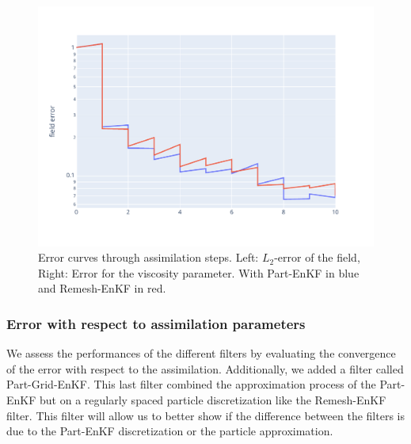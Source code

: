 \begin{figure}[htbp]
	\centering
	\includegraphics*[width=\linewidth]{images/app2d/field_error_w_assim.pdf}
	\caption{Error curves through assimilation steps. Left: \(L_2\)-error of the field, Right: Error for the viscosity parameter. With Part-EnKF in blue and Remesh-EnKF in red.}
	\label{fig:assim_time}
\end{figure}


\subsubsection{Error with respect to assimilation parameters}
We assess the performances of the different filters by evaluating the convergence of the error with respect to the assimilation. Additionally, we added a filter called Part-Grid-EnKF. This last filter combined the approximation process of the Part-EnKF but on a regularly spaced particle discretization like the Remesh-EnKF filter. This filter will allow us to better show if the difference between the filters is due to the Part-EnKF discretization or the particle approximation.

